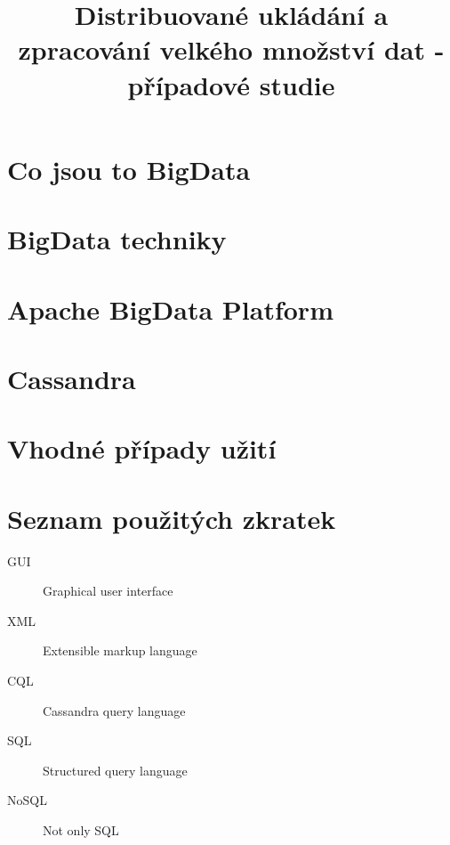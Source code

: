\documentclass[thesis=M,czech]{FITthesis}[2012/06/26]
\title{Distribuované ukládání a zpracování velkého množství dat - případové studie}
\begin{document}
	

\begin{introduction}




\end{introduction}


\chapter{Co jsou to BigData}




\chapter{BigData techniky}



\chapter{Apache BigData Platform}



\chapter{Cassandra}	




\chapter{Vhodné případy užití}



\begin{conclusion}

\end{conclusion}

\nocite{*}



\appendix

\chapter{Seznam použitých zkratek}
\begin{description}
	\item[GUI] Graphical user interface
	\item[XML] Extensible markup language
	\item[CQL] Cassandra query language
	\item[SQL] Structured query language
	\item[NoSQL] Not only SQL
\end{description}
\end{document}
